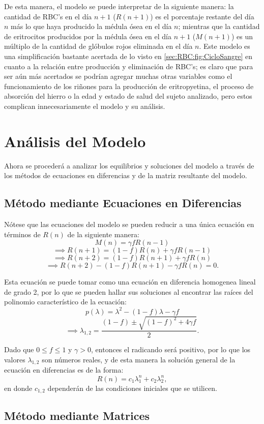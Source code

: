 De esta manera, el modelo se puede interpretar de la siguiente manera: la cantidad de RBC's en el día $n+1$ ($R(n+1)$) es el porcentaje restante del día $n$ más lo que haya producido la médula ósea en el día $n$; mientras que la cantidad de eritrocitos producidos por la médula ósea en el día $n+1$ ($M(n+1)$) es un múltiplo de la cantidad de glóbulos rojos eliminada en el día $n$. Este modelo es una simplificación bastante acertada de lo visto en \ref{sec:RBC:fig:CicloSangre} en cuanto a la relación entre producción y eliminación de RBC's; es claro que para ser aún más acertados se podrían agregar muchas otras variables como el funcionamiento de los riñones para la producción de eritropyetina, el proceso de absorción del hierro o la edad y estado de salud del sujeto analizado, pero estos complican innecesariamente el modelo y su análisis.

\section{Análisis del Modelo}\label{sec:modelo:analisis}
Ahora se procederá a analizar los equilibrios y soluciones del modelo a través de los métodos de ecuaciones en diferencias y de la matriz resultante del modelo.
\subsection{Método mediante Ecuaciones en Diferencias}

Nótese que las ecuaciones del modelo se pueden reducir a una única ecuación en términos de $R(n)$ de la siguiente manera:
$$M(n)=\gamma f R(n-1)$$
$$\implies R(n+1)=(1-f)R(n)+\gamma f R(n-1)$$
$$\implies R(n+2)=(1-f)R(n+1)+\gamma f R(n)$$
$$\implies R(n+2)-(1-f)R(n+1)-\gamma f R(n)=0.$$

Esta ecuación se puede tomar como una ecuación en diferencia homogenea lineal de grado 2, por lo que se pueden hallar sus soluciones al encontrar las raíces del polinomio característico de la ecuación:
$$p(\lambda)=\lambda^2-(1-f)\lambda-\gamma f$$
$$\implies \lambda_{1,2}=\dfrac{(1-f)\pm\sqrt{(1-f)^2+4\gamma f}}{2}.$$

Dado que $0\leq f \leq 1$ y $\gamma > 0$, entonces el radicando será positivo, por lo que los valores $\lambda_{1,2}$ son números reales, y de esta manera la solución general de la ecuación en diferencias es de la forma:
$$R(n)=c_1 \lambda_1^n+ c_2 \lambda_2^n,$$
en donde $c_{1,2}$ dependerán de las condiciones iniciales que se utilicen.

\subsection{Método mediante Matrices}

